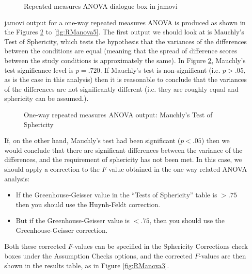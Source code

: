 \begin{figure}[!htb]
\begin{center}
\caption{Repeated measures ANOVA dialogue box in jamovi}
\HR
\label{fig:RManova1}
\end{center}
\end{figure}

jamovi output for a one-way repeated measures ANOVA is produced as shown in the Figures \ref{fig:RManova2} to \ref{fig:RManova5}. The first output we should look at is Mauchly’s Test of Sphericity, which tests the hypothesis that the variances of the differences between the conditions are equal (meaning that the spread of difference scores between the study conditions is approximately the same). In Figure \ref{fig:RManova2}, Mauchly’s test significance level is $p=.720$. If Mauchly’s test is non-significant (i.e. $p>.05$, as is the case in this analysis) then it is reasonable to conclude that the variances of the differences are not significantly different (i.e. they are roughly equal and sphericity can be assumed.). 

\begin{figure}[!ht]
\begin{center}
\caption{One-way repeated measures ANOVA output: Mauchly’s Test of Sphericity}
\HR
\label{fig:RManova2}
\end{center}
\end{figure}

If, on the other hand, Mauchly’s test had been significant ($p<.05$) then we would conclude that there are significant differences between the variance of the differences, and the requirement of sphericity has not been met. In this case, we should apply a correction to the $F$-value obtained in the one-way related ANOVA analysis: 

\begin{itemize} \itemsep -2pt
\item If the Greenhouse-Geisser value in the “Tests of Sphericity” table is $>.75$ then you should use the Huynh-Feldt correction. 
\item But if the Greenhouse-Geisser value is $<.75$, then you should use the Greenhouse-Geisser correction. 
\end{itemize}

Both these corrected $F$-values can be specified in the Sphericity Corrections check boxes under the Assumption Checks options, and the corrected $F$-values are then shown in the results table, as in Figure \ref{fig:RManova3}.

